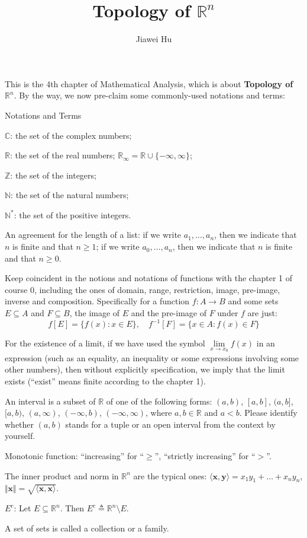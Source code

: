 \documentclass{article}
\title{\LARGE \textbf{Topology of $\mathbb{R}^n$}}
\author{\large Jiawei Hu}
\begin{document}
\maketitle

This is the 4th chapter of Mathematical Analysis, which is about \textbf{Topology of $\mathbb{R}^n$}. By the way, we now pre-claim some commonly-used notations and terms:
\begin{Df}{Notations and Terms}
    \begin{compactenum}
        \item $\mathbb{C}$: the set of the complex numbers;
        \item $\mathbb{R}$: the set of the real numbers; $\mathbb{R}_\infty = \mathbb{R}\cup\{-\infty, \infty\}$;
        \item $\mathbb{Z}$: the set of the integers;
        \item $\mathbb{N}$: the set of the natural numbers;
        \item $\mathbb{N^\ast}$: the set of the positive integers.
        \item An agreement for the length of a list: if we write $a_1, \dots, a_n$, then we indicate that $n$ is finite and that $n\geq 1$; if we write $a_0, \dots, a_n$, then we indicate that $n$ is finite and that $n\geq 0$.
        \item Keep coincident in the notions and notations of functions with the chapter 1 of course 0, including the ones of domain, range, restriction, image, pre-image, inverse and composition. Specifically for a function $f: A\rightarrow B$ and some sets $E\subseteq A$ and $F\subseteq B$, the image of $E$ and the pre-image of $F$ under $f$ are just:
        $$f[E] = \{f(x): x\in E\},\quad f^{-1}[F] = \{x\in A: f(x)\in F\}$$
        \item For the existence of a limit, if we have used the symbol $\lim\limits_{x\to x_0} f(x)$ in an expression (such as an equality, an inequality or some expressions involving some other numbers), then without explicitly specification, we imply that the limit exists (``exist'' means finite according to the chapter 1).
        \item An interval is a subset of $\mathbb{R}$ of one of the following forms: $(a,b)$, $[a,b]$, $(a,b]$, $[a,b)$, $(a, \infty)$, $(-\infty, b)$, $(-\infty, \infty)$, where $a, b\in\mathbb{R}$ and $a<b$. Please identify whether $(a,b)$ stands for a tuple or an open interval from the context by yourself.
        \item Monotonic function: ``increasing'' for ``$\geq$'', ``strictly increasing'' for ``$>$''.
        \item The inner product and norm in $\mathbb{R}^n$ are the typical ones: $\langle \pmb{x}, \pmb{y}\rangle = x_1y_1 + \dots + x_ny_n$, $\Vert \pmb{x}\Vert = \sqrt{\langle \pmb{x}, \pmb{x}\rangle}$.
        \item $E^c$: Let $E\subseteq\mathbb{R}^n$. Then $E^c\triangleq \mathbb{R}^n\setminus E$.
        \item A set of sets is called a collection or a family.
    \end{compactenum}
\end{Df}
\end{document}
